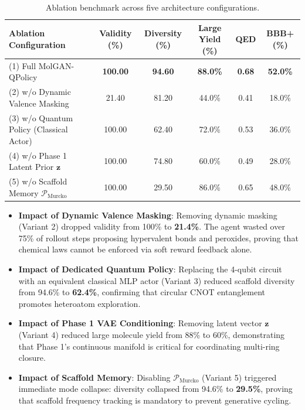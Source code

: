 \documentclass[10pt,a4paper]{article}
\begin{document}
\begin{table}[!htbp]
\centering
\caption{Ablation benchmark across five architecture configurations.}
\label{tab:table5_ablation}
\small
\begin{tabularx}{\linewidth}{@{}lccccc@{}}
\toprule
\textbf{Ablation Configuration} & \textbf{Validity (\%)} & \textbf{Diversity (\%)} & \textbf{Large Yield (\%)} & \textbf{QED} & \textbf{BBB+ (\%)} \\ \midrule
(1) Full MolGAN-QPolicy & \textbf{100.00} & \textbf{94.60} & \textbf{88.0\%} & \textbf{0.68} & \textbf{52.0\%} \\
(2) w/o Dynamic Valence Masking & 21.40 & 81.20 & 44.0\% & 0.41 & 18.0\% \\
(3) w/o Quantum Policy (Classical Actor) & 100.00 & 62.40 & 72.0\% & 0.53 & 36.0\% \\
(4) w/o Phase 1 Latent Prior $\mathbf{z}$ & 100.00 & 74.80 & 60.0\% & 0.49 & 28.0\% \\
(5) w/o Scaffold Memory $\mathcal{P}_{\text{Murcko}}$ & 100.00 & 29.50 & 86.0\% & 0.65 & 48.0\% \\ \bottomrule
\end{tabularx}
\end{table}

\begin{itemize}[noitemsep]
    \item \textbf{Impact of Dynamic Valence Masking}: Removing dynamic masking (Variant 2) dropped validity from 100\% to \textbf{21.4\%}. The agent wasted over 75\% of rollout steps proposing hypervalent bonds and peroxides, proving that chemical laws cannot be enforced via soft reward feedback alone.
    \item \textbf{Impact of Dedicated Quantum Policy}: Replacing the 4-qubit circuit with an equivalent classical MLP actor (Variant 3) reduced scaffold diversity from 94.6\% to \textbf{62.4\%}, confirming that circular CNOT entanglement promotes heteroatom exploration.
    \item \textbf{Impact of Phase 1 VAE Conditioning}: Removing latent vector $\mathbf{z}$ (Variant 4) reduced large molecule yield from 88\% to 60\%, demonstrating that Phase 1's continuous manifold is critical for coordinating multi-ring closure.
    \item \textbf{Impact of Scaffold Memory}: Disabling $\mathcal{P}_{\text{Murcko}}$ (Variant 5) triggered immediate mode collapse: diversity collapsed from 94.6\% to \textbf{29.5\%}, proving that scaffold frequency tracking is mandatory to prevent generative cycling.
\end{itemize}
\end{document}

